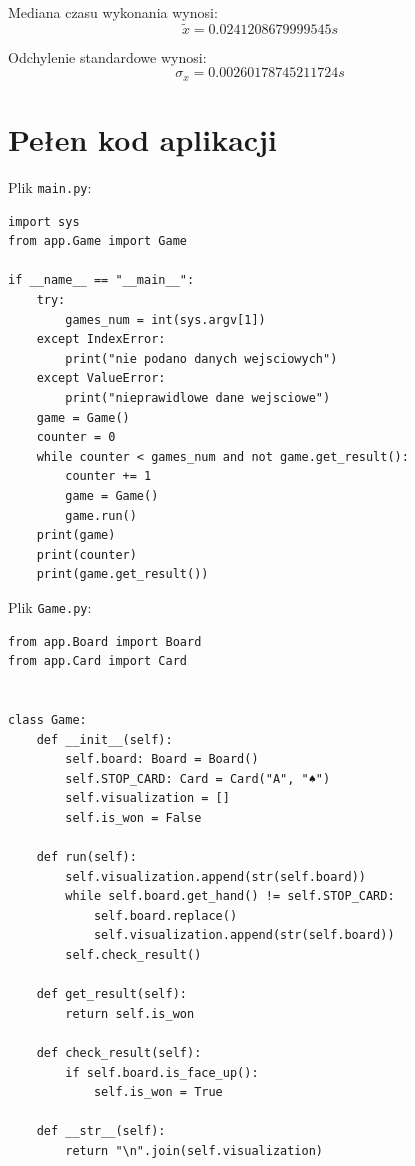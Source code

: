 \documentclass[12pt,a4paper]{article}
\begin{document}
Mediana czasu wykonania wynosi:
\begin{equation}
    \tilde{x} = 0.0241208679999545 s
\end{equation}

Odchylenie standardowe wynosi:
\begin{equation}
    \sigma_x = 0.00260178745211724 s
\end{equation}

\newpage
\section*{Pełen kod aplikacji}

Plik \texttt{main.py}:
\begin{lstlisting}
import sys
from app.Game import Game

if __name__ == "__main__":
    try:
        games_num = int(sys.argv[1])
    except IndexError:
        print("nie podano danych wejsciowych")
    except ValueError:
        print("nieprawidlowe dane wejsciowe")
    game = Game()
    counter = 0
    while counter < games_num and not game.get_result():
        counter += 1
        game = Game()
        game.run()
    print(game)
    print(counter)
    print(game.get_result())
\end{lstlisting}

Plik \texttt{Game.py}:
\begin{lstlisting}
from app.Board import Board
from app.Card import Card


class Game:
    def __init__(self):
        self.board: Board = Board()
        self.STOP_CARD: Card = Card("A", "♠")
        self.visualization = []
        self.is_won = False

    def run(self):
        self.visualization.append(str(self.board))
        while self.board.get_hand() != self.STOP_CARD:
            self.board.replace()
            self.visualization.append(str(self.board))
        self.check_result()

    def get_result(self):
        return self.is_won

    def check_result(self):
        if self.board.is_face_up():
            self.is_won = True

    def __str__(self):
        return "\n".join(self.visualization)

\end{lstlisting}

\newpage
\end{document}
